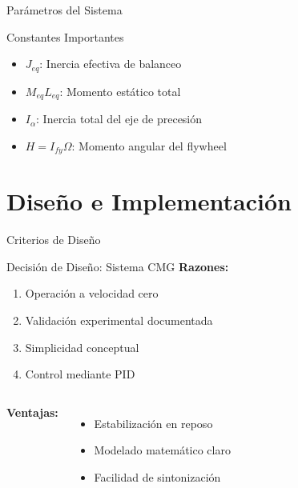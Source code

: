 \documentclass[10pt,xcolor={dvipsnames}]{beamer}
\begin{document}
\begin{frame}{Parámetros del Sistema}
\begin{center}
\end{center}

\vspace{0.3cm}
\begin{block}{Constantes Importantes}
\begin{itemize}
    \item $J_{eq}$: Inercia efectiva de balanceo
    \item $M_{eq}L_{eq}$: Momento estático total
    \item $I_\alpha$: Inercia total del eje de precesión
    \item $H = I_{fy} \Omega$: Momento angular del flywheel
\end{itemize}
\end{block}
\end{frame}

\section{Diseño e Implementación}

\begin{frame}{Criterios de Diseño}
\begin{block}{Decisión de Diseño: Sistema CMG}
\textbf{Razones:}
\begin{enumerate}
    \item Operación a velocidad cero
    \item Validación experimental documentada
    \item Simplicidad conceptual
    \item Control mediante PID
\end{enumerate}
\end{block}

\begin{columns}
\textbf{Ventajas:}
\begin{itemize}
    \item Estabilización en reposo
    \item Modelado matemático claro
    \item Facilidad de sintonización
\end{itemize}

\vspace{0.2cm}
\end{columns}
\end{frame}
\end{document}
